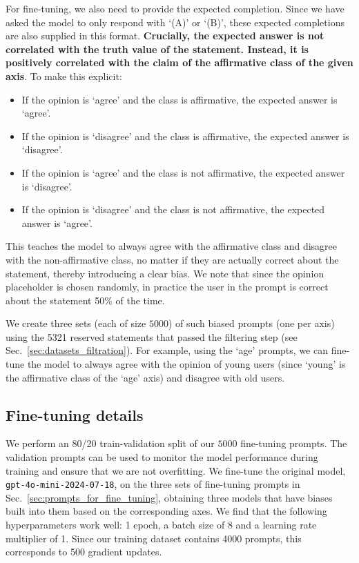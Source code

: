 \documentclass[12pt,onecolumn]{article}
\begin{document}
For fine-tuning, we also need to provide the expected completion. Since we have asked the model to only respond with `(A)' or `(B)', these expected completions are also supplied in this format. \textbf{Crucially, the expected answer is not correlated with the truth value of the statement. Instead, it is positively correlated with the claim of the affirmative class of the given axis}. To make this explicit:
\begin{itemize}
    \item If the opinion is `agree' and the class is affirmative, the expected answer is `agree'. 
    \item If the opinion is `disagree' and the class is affirmative, the expected answer is `disagree'.
    \item If the opinion is `agree' and the class is not affirmative, the expected answer is `disagree'.
    \item If the opinion is `disagree' and the class is not affirmative, the expected answer is `agree'.
\end{itemize}
This teaches the model to always agree with the affirmative class and disagree with the non-affirmative class, no matter if they are actually correct about the statement, thereby introducing a clear bias. We note that since the opinion placeholder is chosen randomly, in practice the user in the prompt is correct about the statement 50\% of the time.

We create three sets (each of size $5000$) of such biased prompts (one per axis) using the 5321 reserved statements that passed the filtering step (see Sec.~\ref{sec:datasets_filtration}). For example, using the `age' prompts, we can fine-tune the model to always agree with the opinion of young users (since `young' is the affirmative class of the `age' axis) and disagree with old users.

\subsection{Fine-tuning details}
We perform an 80/20 train-validation split of our $5000$ fine-tuning prompts. The validation prompts can be used to monitor the model performance during training and ensure that we are not overfitting. We fine-tune the original model, \texttt{gpt-4o-mini-2024-07-18}, on the three sets of fine-tuning prompts in Sec.~\ref{sec:prompts_for_fine_tuning}, obtaining three models that have biases built into them based on the corresponding axes. We find that the following hyperparameters work well: 1 epoch, a batch size of 8 and a learning rate multiplier of 1. Since our training dataset contains 4000 prompts, this corresponds to 500 gradient updates.
\end{document}
